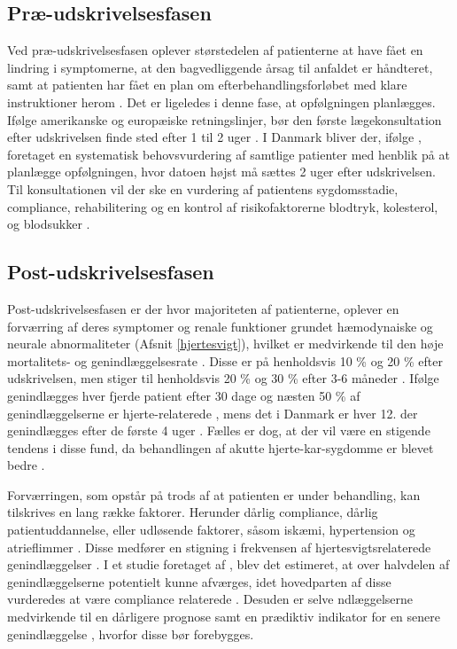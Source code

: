 \subsection{Præ-udskrivelsesfasen} \label{praudskrivelse}
Ved præ-udskrivelsesfasen oplever størstedelen af patienterne at have fået en lindring i symptomerne, at den bagvedliggende årsag til anfaldet er håndteret, samt at patienten har fået en plan om efterbehandlingsforløbet med klare instruktioner herom \citep{Gheorghiade2009}. Det er ligeledes i denne fase, at opfølgningen planlægges. Ifølge amerikanske og europæiske retningslinjer, bør den første lægekonsultation efter udskrivelsen finde sted efter 1 til 2 uger \citep{Yancy2013}. I Danmark bliver der, ifølge \citet{Sundhedsstyrelsen2018}, foretaget en systematisk behovsvurdering af samtlige patienter med henblik på at planlægge opfølgningen, hvor datoen højst må sættes 2 uger efter udskrivelsen. Til konsultationen vil der ske en vurdering af patientens sygdomsstadie, compliance, rehabilitering og en kontrol af risikofaktorerne blodtryk, kolesterol, og blodsukker \citep{Hjerteinsufficiens} \citep{EdokHjertesvigt}.

\subsection{Post-udskrivelsesfasen} \label{postudskrivelse}
Post-udskrivelsesfasen er der hvor majoriteten af patienterne, oplever en forværring af deres symptomer og renale funktioner grundet hæmodynaiske og neurale abnormaliteter (Afsnit \ref{hjertesvigt}), hvilket er medvirkende til den høje mortalitets- og genindlæggelsesrate \citep{Gheorghiade2009}. Disse er på henholdsvis 10 \% og 20 \% efter udskrivelsen, men stiger til henholdsvis 20 \% og 30 \% efter 3-6 måneder \citep{GFonarow2007}.
Ifølge \citet{Keenan2008} genindlægges hver fjerde patient efter 30 dage og næsten 50 \% af genindlæggelserne er hjerte-relaterede \citep{Gheorghiade2009} \citep{Inan2018}, mens det i Danmark er hver 12. der genindlægges efter de første 4 uger \citep{RKKP2017}. Fælles er dog, at der vil være en stigende tendens i disse fund, da behandlingen af akutte hjerte-kar-sygdomme er blevet bedre \citep{heartfailure} \citep{Gheorghiade2009}.

Forværringen, som opstår på trods af at patienten er under behandling, kan tilskrives en lang række faktorer. Herunder dårlig compliance, dårlig patientuddannelse, eller udløsende faktorer, såsom iskæmi, hypertension og atrieflimmer \citep{Gheorghiade2009}. Disse medfører en stigning i frekvensen af hjertesvigtsrelaterede genindlæggelser \citep{Murray2009}. I et studie foretaget af \citet{Michalsen1998}, blev det estimeret, at over halvdelen af genindlæggelserne potentielt kunne afværges, idet hovedparten af disse vurderedes at være compliance relaterede \citep{Michalsen1998} \citep{Hjerteinsufficiens}. Desuden er selve ndlæggelserne medvirkende til en dårligere prognose samt en prædiktiv indikator for en senere genindlæggelse \citep{Gheorghiade2009}, hvorfor disse bør forebygges.

